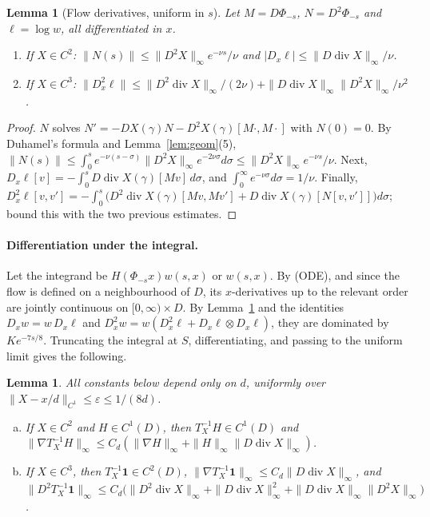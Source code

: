 \documentclass[11pt]{article}
\newtheorem{lemma}[theorem]{Lemma}
\theoremstyle{definition}
\theoremstyle{remark}
\newcommand{\one}{\mathbf 1}
\newcommand{\dv}{\operatorname{div}}
\begin{document}
\begin{lemma}[Flow derivatives, uniform in $s$]\label{lem:flowder}
Let $M=D\Phi_{-s}$, $N=D^2\Phi_{-s}$ and $\ell=\log w$, all differentiated in $x$.
\begin{enumerate}[(1)]
\item If $X\in C^2$: $\|N(s)\|\le\|D^2X\|_\infty e^{-\nu s}/\nu$ and $|D_x\ell|\le\|D\dv X\|_\infty/\nu$.
\item If $X\in C^3$: $\|D_x^2\ell\|\le\|D^2\dv X\|_\infty/(2\nu)+\|D\dv X\|_\infty\|D^2X\|_\infty/\nu^2$.
\end{enumerate}
\end{lemma}

\begin{proof}
$N$ solves $N'=-DX(\gamma)N-D^2X(\gamma)[M\cdot,M\cdot]$ with $N(0)=0$. By Duhamel's formula and Lemma~\ref{lem:geom}(5),
$\|N(s)\|\le\int_0^se^{-\nu(s-\sigma)}\|D^2X\|_\infty e^{-2\nu\sigma}d\sigma\le\|D^2X\|_\infty e^{-\nu s}/\nu$.
Next, $D_x\ell[v]=-\int_0^sD\dv X(\gamma)[Mv]\,d\sigma$, and $\int_0^\infty e^{-\nu\sigma}d\sigma=1/\nu$. Finally,
$D^2_x\ell[v,v']=-\int_0^s\big(D^2\dv X(\gamma)[Mv,Mv']+D\dv X(\gamma)[N[v,v']]\big)d\sigma$; bound this with the two previous estimates.
\end{proof}

\paragraph{Differentiation under the integral.} Let the integrand be $H(\Phi_{-s}x)w(s,x)$ or $w(s,x)$. By (ODE), and since the flow is defined on a neighbourhood of $D$, its $x$-derivatives up to the relevant order are jointly continuous on $[0,\infty)\times D$. By Lemma~\ref{lem:flowder} and the identities $D_xw=w\,D_x\ell$ and $D_x^2w=w(D_x^2\ell+D_x\ell\otimes D_x\ell)$, they are dominated by $Ke^{-7s/8}$. Truncating the integral at $S$, differentiating, and passing to the uniform limit gives the following.

\begin{lemma}\label{lem:Treg}
All constants below depend only on $d$, uniformly over $\|X-x/d\|_{C^1}\le\varepsilon\le1/(8d)$.
\begin{enumerate}[(a)]
\item[\textup{(d)}] If $X\in C^2$ and $H\in C^1(D)$, then $T^{-1}_XH\in C^1(D)$ and
$\|\nabla T^{-1}_XH\|_\infty\le C_d(\|\nabla H\|_\infty+\|H\|_\infty\|D\dv X\|_\infty)$.
\item[\textup{(e)}] If $X\in C^3$, then $T^{-1}_X\one\in C^2(D)$, $\|\nabla T^{-1}_X\one\|_\infty\le C_d\|D\dv X\|_\infty$, and
$\|D^2T_X^{-1}\one\|_\infty\le C_d\big(\|D^2\dv X\|_\infty+\|D\dv X\|_\infty^2+\|D\dv X\|_\infty\|D^2X\|_\infty\big)$.
\end{enumerate}
\end{lemma}
\end{document}

